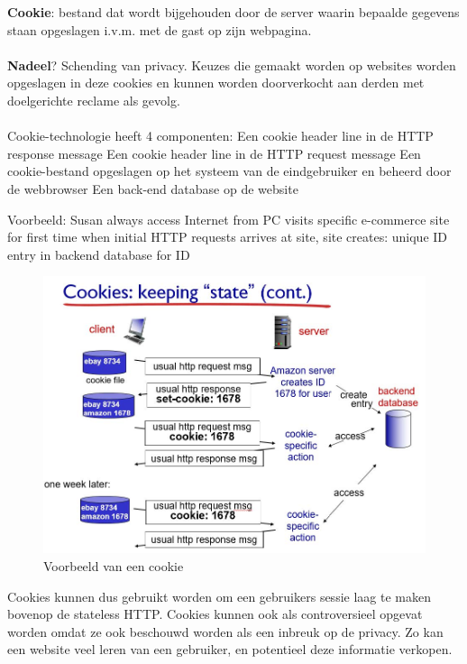 \textbf{Cookie}: bestand dat wordt bijgehouden door de server waarin bepaalde gegevens staan opgeslagen i.v.m. met de gast op zijn webpagina.\\\\
\textbf{Nadeel}? Schending van privacy. Keuzes die gemaakt worden op websites worden opgeslagen in deze cookies en kunnen worden doorverkocht aan derden met doelgerichte reclame als gevolg.\\\\
Cookie-technologie heeft 4 componenten:
\be
\itf Een cookie header line in de HTTP response message
\itf Een cookie header line in de HTTP request message
\itf Een cookie-bestand opgeslagen op het systeem van de eindgebruiker en beheerd door de webbrowser
\itf Een back-end database op de website
\ee

\noindent Voorbeeld:
\be
\itf Susan always access Internet from PC
\itf visits specific e-commerce site for first time
\itf when initial HTTP requests arrives at site, site creates:
\itf unique ID
\itf entry in backend database for ID
\ee

\begin{figure}[h]
    \centering
    \includegraphics[width=4.5in]{./img/imghfdst2/cookie.jpg}
    \caption{Voorbeeld van een cookie }
    \label{fig:cookie}
\end{figure}

Cookies kunnen dus gebruikt worden om een gebruikers sessie laag te maken bovenop de stateless HTTP. Cookies kunnen ook als controversieel opgevat worden omdat ze ook beschouwd worden als een inbreuk op de privacy. Zo kan een website veel leren van een gebruiker, en potentieel deze informatie verkopen.\\\\

